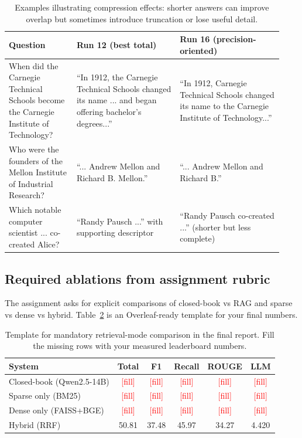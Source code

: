 \documentclass[11pt,twocolumn]{article}
\begin{document}
\begin{table}[t]
\centering
\small
\begin{tabular}{p{0.23\linewidth} p{0.35\linewidth} p{0.35\linewidth}}
\toprule
\textbf{Question} & \textbf{Run 12 (best total)} & \textbf{Run 16 (precision-oriented)} \\
\midrule
When did the Carnegie Technical Schools become the Carnegie Institute of Technology? &
``In 1912, the Carnegie Technical Schools changed its name ... and began offering bachelor's degrees...'' &
``In 1912, Carnegie Technical Schools changed its name to the Carnegie Institute of Technology...'' \\
\addlinespace
Who were the founders of the Mellon Institute of Industrial Research? &
``... Andrew Mellon and Richard B. Mellon.'' &
``... Andrew Mellon and Richard B.'' \\
\addlinespace
Which notable computer scientist ... co-created Alice? &
``Randy Pausch ...'' with supporting descriptor &
``Randy Pausch co-created ...'' (shorter but less complete) \\
\bottomrule
\end{tabular}
\caption{Examples illustrating compression effects: shorter answers can improve overlap but sometimes introduce truncation or lose useful detail.}
\label{tab:qual_examples}
\end{table}

\subsection{Required ablations from assignment rubric}
The assignment asks for explicit comparisons of closed-book vs RAG and sparse vs dense vs hybrid. Table~\ref{tab:required_ablation} is an Overleaf-ready template for your final numbers.

\begin{table}[t]
\centering
\small
\begin{tabular}{l c c c c c}
\toprule
\textbf{System} & \textbf{Total} & \textbf{F1} & \textbf{Recall} & \textbf{ROUGE} & \textbf{LLM} \\
\midrule
Closed-book (Qwen2.5-14B) & \textcolor{red}{[fill]} & \textcolor{red}{[fill]} & \textcolor{red}{[fill]} & \textcolor{red}{[fill]} & \textcolor{red}{[fill]} \\
Sparse only (BM25) & \textcolor{red}{[fill]} & \textcolor{red}{[fill]} & \textcolor{red}{[fill]} & \textcolor{red}{[fill]} & \textcolor{red}{[fill]} \\
Dense only (FAISS+BGE) & \textcolor{red}{[fill]} & \textcolor{red}{[fill]} & \textcolor{red}{[fill]} & \textcolor{red}{[fill]} & \textcolor{red}{[fill]} \\
Hybrid (RRF) & 50.81 & 37.48 & 45.97 & 34.27 & 4.420 \\
\bottomrule
\end{tabular}
\caption{Template for mandatory retrieval-mode comparison in the final report. Fill the missing rows with your measured leaderboard numbers.}
\label{tab:required_ablation}
\end{table}
\end{document}
